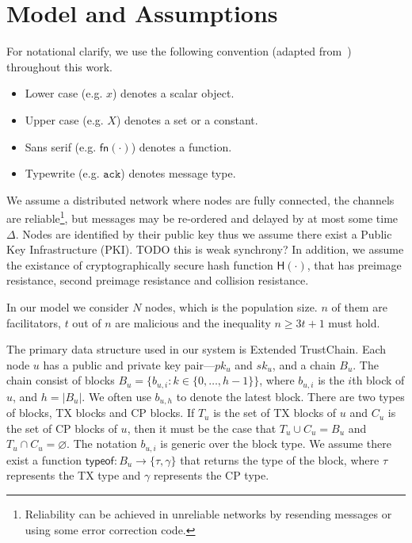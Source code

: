 \section{Model and Assumptions}
\label{sec:model-assumptions}

For notational clarify, we use the following convention (adapted from~\cite{miller2016honey}) throughout this work.
\begin{itemize}
\item Lower case (e.g. $x$) denotes a scalar object.
\item Upper case (e.g. $X$) denotes a set or a constant.
\item Sans serif (e.g. $\textsf{fn}(\cdot)$) denotes a function.
\item Typewrite (e.g. $\texttt{ack}$) denotes message type.
\end{itemize}

We assume a distributed network where nodes are fully connected,
the channels are reliable\footnote{
    Reliability can be achieved in unreliable networks by resending messages or using some error correction code.
},
but messages may be re-ordered and delayed by at most some time $\Delta$.
Nodes are identified by their public key thus we assume there exist a Public Key Infrastructure (PKI).
TODO this is weak synchrony?
In addition, we assume the existance of cryptographically secure hash function $\textsf{H}(\cdot)$,
that has preimage resistance, second preimage resistance and collision resistance.

In our model we consider $N$ nodes, which is the population size.
$n$ of them are facilitators, $t$ out of $n$ are malicious and the inequality
$n \ge 3t + 1$ must hold.

The primary data structure used in our system is Extended TrustChain.
Each node $u$ has a public and private key pair---$pk_u$ and $sk_u$, and a chain $B_u$.
The chain consist of blocks $B_u = \{ b_{u, i} : k \in \{ 0, \dots, h - 1 \} \}$,
where $b_{u, i}$ is the $i$th block of $u$,
and $h = |B_u|$.
We often use $b_{u, h}$ to denote the latest block.
There are two types of blocks, TX blocks and CP blocks.
If $T_u$ is the set of TX blocks of $u$ and $C_u$ is the set of CP blocks of $u$,
then it must be the case that $T_u \cup C_u = B_u$ and $T_u \cap C_u = \varnothing$.
The notation $b_{u, i}$ is generic over the block type.
We assume there exist a function $\textsf{typeof}: B_u \rightarrow \{ \tau, \gamma \}$ that returns the type of the block,
where $\tau$ represents the TX type and $\gamma$ represents the CP type.

